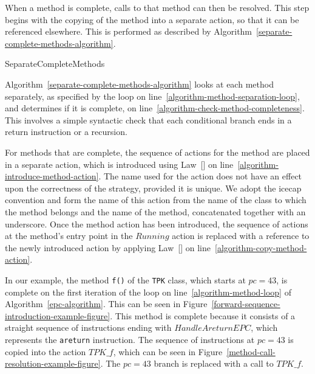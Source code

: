 When a method is complete, calls to that method can then be resolved.
This step begins with the copying of the method into a separate
action, so that it can be referenced elsewhere.
This is performed as described by
Algorithm~\ref{separate-complete-methods-algorithm}.
\begin{algorithm}
  \begin{algorithmic}[1]
     \label{algorithm-method-separation-loop}
     \label{algorithm-check-method-completeness}
    \State {} \label{algorithm-introduce-method-action}
    \State {} \label{algorithm-copy-method-action}
    \EndIf
    \EndFor
  \end{algorithmic}
  \caption{SeparateCompleteMethods}
  \label{separate-complete-methods-algorithm}
\end{algorithm}

Algorithm~\ref{separate-complete-methods-algorithm} looks at each
method separately, as specified by the loop on
line~\ref{algorithm-method-separation-loop}, and determines if it is
complete, on line~\ref{algorithm-check-method-completeness}.
This involves a simple syntactic check that each conditional branch
ends in a return instruction or a recursion.

For methods that are complete, the sequence of actions for the method
are placed in a separate action, which is introduced using
Law~[] on
line~\ref{algorithm-introduce-method-action}.
The name used for the action does not have an effect upon the
correctness of the strategy, provided it is unique.
We adopt the icecap convention and form the name of this action from
the name of the class to which the method belongs and the name of the
method, concatenated together with an underscore.
Once the method action has been introduced, the sequence of actions at
the method's entry point in the $Running$ action is replaced with a
reference to the newly introduced action by applying
Law~[] on
line~\ref{algorithm-copy-method-action}.

In our example, the method \texttt{f()} of the \texttt{TPK} class,
which starts at $pc = 43$, is complete on the first iteration of the
loop on line~\ref{algorithm-method-loop} of
Algorithm~\ref{epc-algorithm}.
This can be seen in
Figure~\ref{forward-sequence-introduction-example-figure}.
This method is complete because it consists of a straight sequence of
instructions ending with $HandleAreturnEPC$, which represents the
\texttt{areturn} instruction.
The sequence of instructions at $pc = 43$ is copied into the action
$TPK\_f$, which can be seen in
Figure~\ref{method-call-resolution-example-figure}.
The $pc = 43$ branch is replaced with a call to $TPK\_f$.

